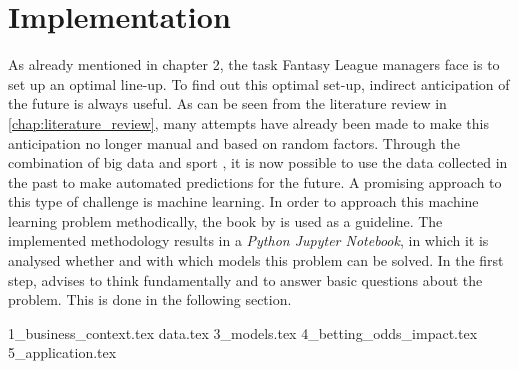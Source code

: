 \chapter{Implementation}

As already mentioned in chapter 2, the task Fantasy League managers face is to set up an optimal line-up. To find out this optimal set-up, indirect anticipation of the future is always useful. As can be seen from the literature review in \autoref{chap:literature_review}, many attempts have already been made to make this anticipation no longer manual and based on random factors. Through the combination of big data and sport \parencite[][cf.]{rein_big_2016}, it is now possible to use the data collected in the past to make automated predictions for the future. A promising approach to this type of challenge is machine learning. In order to approach this machine learning problem methodically, the book  by \citeauthor{geron_hands-machine_2019} is used as a guideline. The implemented methodology results in a \emph{Python Jupyter Notebook}, in which it is analysed whether and with which models this problem can be solved. In the first step, \citeauthor{geron_hands-machine_2019} advises to think fundamentally and to answer basic questions about the problem. This is done in the following section.

{1_business_context.tex}
{data.tex}
{3_models.tex}
{4_betting_odds_impact.tex}
{5_application.tex}



